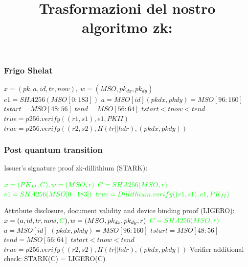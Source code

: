 \documentclass{beamer}
\begin{document}
\title{Trasformazioni del nostro algoritmo zk:}
\maketitle
\begin{frame}
\frametitle{Frigo Shelat}
$x = (pk,a,id,tr,now),\ w = (MSO,pk_{dx},pk_{dy})$\newline
$e1 = SHA256(MSO[0 : 183])$\newline
$a = MSO[id]$\newline $
(pkdx, pkdy) = MSO[96 : 160]$\newline
$tstart = MSO[48 : 56]$\newline
$tend = MSO[56 : 64]$\newline
$tstart < tnow < tend$\newline
$true = p256.verify((r1, s1), e1, PKI I )$\newline
$true = p256.verify((r2, s2), H(tr||hdr), (pkdx, pkdy))$
\end{frame}
\begin{frame}
\frametitle{Post quantum transition}
Issuer's signature proof zk-dillithium (STARK):

$\textcolor{green}{x = (PK_{II},C), w = (MSO,r)}$\newline
$\textcolor{green}{C = SHA256(MSO,r)}$\newline
$\textcolor{green}{e1 = SHA256(MSO[0 : 183])}$\newline
$\textcolor{green}{true = Dillithium.verify((r1, s1), e1, PK_{II} )}$\newline

Attribute disclosure, document validity and device binding proof (LIGERO):\newline
$x = (a,id,tr,now,\textcolor{green}{C}), w = (MSO,pk_{dx},pk_{dy},r)$\newline
$\textcolor{green}{C = SHA256(MSO,r)}$\newline
$a = MSO[id]$\newline
$(pkdx, pkdy) = MSO[96 : 160]$\newline
$tstart = MSO[48 : 56]$\newline
$tend = MSO[56 : 64]$\newline
$tstart < tnow < tend$\newline
$true = p256.verify((r2, s2), H(tr||hdr), (pkdx, pkdy))$\newline\newline
Verifier additional check:
	STARK(C) = LIGERO(C)
\end{frame}
\end{document}

